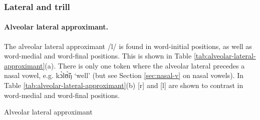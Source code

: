 

\subsubsection{Lateral and trill}
\label{sec:approx-lat-trill}


\paragraph{Alveolar lateral approximant.}

The alveolar lateral approximant /{l}/ is found in word-initial positions, 
as well 
as word-medial and word-final positions. This is shown in Table 
\ref{tab:alveolar-lateral-approximant}(a).  There is only one token where the 
alveolar lateral precedes a nasal vowel, e.g. {\sls kɔ̀lʊ̃̀ŋ́} 
`well'  (but see Section \ref{sec:nasal-v} on nasal vowels).     In Table \ref{tab:alveolar-lateral-approximant}(b)  [r] and  [l] are 
shown to contrast in word-medial and word-final positions.
 
\begin{table}
\caption{Alveolar lateral approximant\label{tab:alveolar-lateral-approximant}}
\quad
{}
\end{table}

